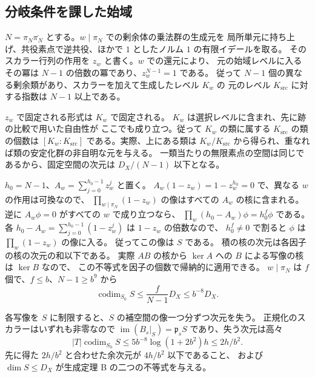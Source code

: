 \subsection{分岐条件を課した始域}

\(N=\pi_N\overline{\pi_N}\) とする。\(w\mid\pi_N\) での剰余体の乗法群の生成元を
局所単元に持ち上げ、共役素点で逆共役、ほかで \(1\) としたノルム \(1\) の有限イデールを取る。
そのスカラー行列の作用を \(z_w\) と書く。\(w\) での還元により、
元の始域レベルに入るその冪は \(N-1\) の倍数の冪であり、\(z_w^{N-1}=1\) である。
従って \(N-1\) 個の異なる剰余類があり、スカラーを加えて生成したレベル \(K_w\) の
元のレベル \(K_{\mathrm{src}}\) に対する指数は \(N-1\) 以上である。

\(z_w\) で固定される形式は \(K_w\) で固定される。
\(K_w\) は選択レベルに含まれ、先に跡の比較で用いた自由性が
ここでも成り立つ。従って \(K_w\) の類に属する \(K_{\mathrm{src}}\) の類の個数は
\([K_w:K_{\mathrm{src}}]\) である。実際、上にある類は \(K_w/K_{\mathrm{src}}\)
から得られ、重なれば類の安定化群の非自明な元を与える。
一類当たりの無限素点の空間は同じであるから、固定空間の次元は
\(D_X/(N-1)\) 以下となる。

\(h_0=N-1\)、\(A_w=\sum_{j=0}^{h_0-1}z_w^j\) と置く。
\(A_w(1-z_w)=1-z_w^{h_0}=0\) で、異なる \(w\) の作用は可換なので、
\(\prod_{w\mid\pi_N}(1-z_w)\) の像はすべての \(A_w\) の核に含まれる。
逆に \(A_w\phi=0\) がすべての \(w\) で成り立つなら、
\(\prod_w(h_0-A_w)\phi=h_0^f\phi\) である。
各 \(h_0-A_w=\sum_{j=0}^{h_0-1}(1-z_w^j)\) は \(1-z_w\) の倍数なので、
\(h_0^f\ne0\) で割ると \(\phi\) は \(\prod_w(1-z_w)\) の像に入る。
従ってこの像は \(S\) である。
積の核の次元は各因子の核の次元の和以下である。
実際 \(AB\) の核から \(\ker A\) への \(B\) による写像の核は \(\ker B\) なので、
この不等式を因子の個数で帰納的に適用できる。
\(w\mid\pi_N\) は \(f\) 個で、\(f\le b\)、\(N-1\ge b^9\) から
\[
 \operatorname{codim}_{S_0} S\le \frac{f}{N-1}D_X\le b^{-8}D_X.
\]

各写像を \(S\) に制限すると、\(S\) の補空間の像一つ分ずつ次元を失う。
正規化のスカラーはいずれも非零なので
\(\operatorname{im}(B_s|_S)=\mathfrak p_sS\) であり、失う次元は高々
\[
   |T|\operatorname{codim}_{S_0}S
   \le 5b^{-8}\log(1+2b^2)h\le 2h/b^2.
\]
先に得た \(2h/b^2\) と合わせた余次元が \(4h/b^2\) 以下であること、
および \(\dim S\le D_X\) が生成定理 B の二つの不等式を与える。
